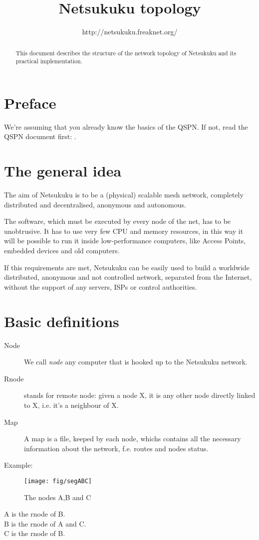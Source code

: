\documentclass[a4paper]{article}
\title{Netsukuku topology}
\author{http://netsukuku.freaknet.org/}
\begin{document}
\maketitle

\begin{abstract}
	This document describes the structure of the network topology of
	Netsukuku and its practical implementation.
\end{abstract}

\section{Preface}
\label{sec:preface}

We're assuming that you already know the basics of the QSPN. If not, read the
QSPN document first: \cite{qspndoc}.

\section{The general idea}
\label{sec:general_idea}

The aim of Netsukuku is to be a (physical) scalable mesh network, completely
distributed and decentralised, anonymous and autonomous.

The software, which must be executed by every node of the net, has to be
unobtrusive. It has to use very few CPU and memory resources, in this way it
will be possible to run it inside low-performance computers, like Access Points,
embedded devices and old computers.

If this requirements are met, Netsukuku can be easily used to build a worldwide
distributed, anonymous and not controlled network, separated from the
Internet, without the support of any servers, ISPs or control authorities.

\section{Basic definitions}

\begin{description}
	\item[Node] We call \emph{node} any computer that is hooked up to the
		Netsukuku network.
	\item[Rnode] stands for remote node: given a node X, it is any other
		node directly linked to X, i.e. it's a neighbour of X.
	\item[Map] A map is a file, keeped by each node, whichs contains all the
		necessary information about the network, f.e. routes and nodes
		status.
\end{description}
Example:\\
\begin{figure}[h]
	\begin{center}
		\texttt{[image: fig/segABC]}
	\end{center}
	\caption{The nodes A,B and C}
\end{figure}
A is the rnode of B.\\
B is the rnode of A and C.\\
C is the rnode of B.
\end{document}
